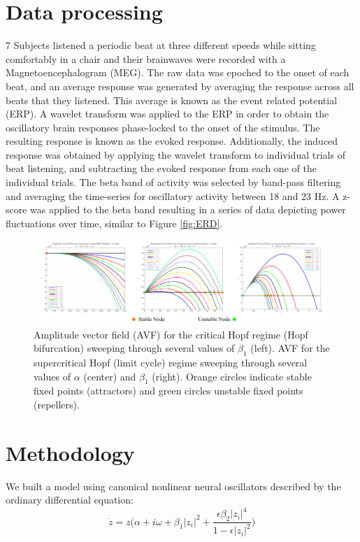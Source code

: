 \documentclass{article}
\begin{document}
\section{Data processing}

7 Subjects listened a periodic beat at three different speeds while sitting comfortably in a chair and their brainwaves were recorded with a Magnetoencephalogram (MEG). The raw data was epoched to the onset of each beat, and an average response was generated by averaging the response across all beats that they listened. This average is known as the event related potential (ERP). A wavelet transform was applied to the ERP in order to obtain the oscillatory brain responses phase-locked to the onset of the stimulus. The resulting response is known as the evoked response. Additionally, the induced response was obtained by applying the wavelet transform to individual trials of beat listening, and subtracting the evoked response from each one of the individual trials. The beta band of activity was selected by band-pass filtering and averaging the time-series for oscillatory activity between 18 and 23 Hz. A z-score was applied to the beta band resulting in a series of data depicting power fluctuations over time, similar to Figure \ref{fig:ERD}.

\begin{figure}[t]
  \centering
  \hspace*{-0.75cm}   
  \includegraphics[scale=0.13]{sub_super_Critical.png}
  \caption{Amplitude vector field (AVF) for the critical Hopf regime (Hopf bifurcation) sweeping through several values of $\beta_1$ (left). AVF for the supercritical Hopf (limit cycle) regime sweeping through several values of $\alpha$ (center) and $\beta_1$ (right). Orange circles indicate stable fixed points (attractors) and green circles unstable fixed points (repellers).}
  \label{fig:sub_super}
\end{figure}

\section{Methodology}
We built a model using canonical nonlinear neural oscillators described by the ordinary differential equation: 
\begin{equation}
\dot{z} = z\bigg( \alpha + i\omega +\beta_1|z_i|^2+\frac{\epsilon\beta_2|z_i|^4}{1-\epsilon|z_i|^2}\bigg)
\end{equation}
\end{document}
